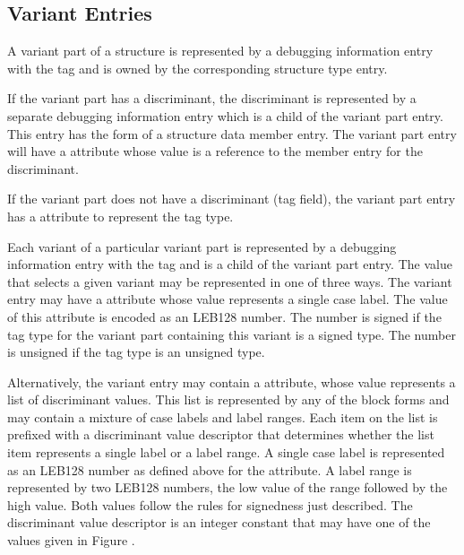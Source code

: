 \subsection{Variant Entries}
\label{chap:variantentries}

A variant part of a structure is represented by a debugging
information entry with the 
tag  and is
owned by the corresponding structure type entry.

If the variant part has a discriminant, the discriminant is
represented by a separate debugging information entry which
is a child of the variant part entry. This entry has the form
of a structure data member entry. The variant part entry will
have a  attribute whose value is a reference to
the member entry for the discriminant.

If the variant part does not have a discriminant (tag field),
the variant part entry has a  attribute to represent
the tag type.

Each variant of a particular variant part is represented by
a debugging information entry with the 
tag 
and is a child of the variant part entry. The value that
selects a given variant may be represented in one of three
ways. The variant entry may have a  attribute
whose value represents a single case label. The value of this
attribute is encoded as an LEB128 number. The number is signed
if the tag type for the variant part containing this variant
is a signed type. The number is unsigned if the tag type is
an unsigned type.

Alternatively, the variant entry may contain a 
attribute, whose value represents a list of discriminant
values. This list is represented by any of the block forms and
may contain a mixture of case labels and label ranges. Each
item on the list is prefixed with a discriminant value
descriptor that determines whether the list item represents
a single label or a label range. A single case label is
represented as an LEB128 number as defined above for the
 attribute. A label range is represented by
two LEB128 numbers, the low value of the range followed by the
high value. Both values follow the rules for signedness just
described. The discriminant value descriptor is an integer
constant that may have one of the values given in 
Figure .

